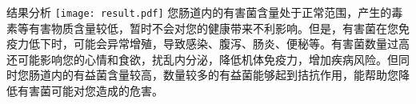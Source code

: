 \vspace*{8mm}


\begin{LRaside}[.8]{结果分析}
\noindent
\texttt{[image: result.pdf]}
\asidebreak %
您肠道内的有害菌含量处于正常范围，产生的毒素等有害物质含量较低，暂时不会对您的健康带来不利影响。但是，有害菌在您免疫力低下时，可能会异常增殖，导致感染、腹泻、肠炎、便秘等。有害菌数量过高还可能影响您的心情和食欲，扰乱内分泌，降低机体免疫力，增加疾病风险。但同时您肠道内的有益菌含量较高，数量较多的有益菌能够起到拮抗作用，能帮助您降低有害菌可能对您造成的危害。
\end{LRaside}


